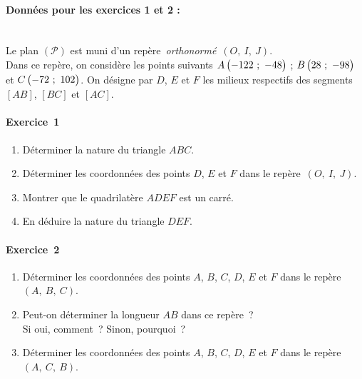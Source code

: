 \documentclass[a4paper,12pt,twocolumn,landscape]{article}
\newcommand{\rep}[3]{~$\left(#1,~#2,~#3\right)$}
\begin{document}
\vspace*{1em}

\begin{minipage}{0.45\textwidth}
\thispagestyle{firststyle}

\vspace*{1em}

\paragraph{Données pour les exercices 1 et 2 :}~\\
Le plan $\left(\mathscr{P}\right)$ est muni d'un repère~\emph{orthonormé}\rep{O}{I}{J}.\\ Dans ce repère, on considère les points suivants $A\begin{pmatrix}-122~;~-48\end{pmatrix}$ ; $B\begin{pmatrix}28~;~-98\end{pmatrix}$ et $C\begin{pmatrix}-72~;~102\end{pmatrix}$.
On désigne par $D$, $E$ et $F$ les milieux respectifs des segments $\left[AB\right]$,  $\left[BC\right]$ et $\left[AC\right]$.

\vspace*{2em}

\paragraph{Exercice~1}

\begin{enumerate}
	\item Déterminer la nature du triangle $ABC$.
	\item Déterminer les coordonnées des points $D$, $E$ et $F$ dans le repère\rep{O}{I}{J}.
	\item Montrer que le quadrilatère $ADEF$ est un carré.
	\item En déduire la nature du triangle $DEF$.
\end{enumerate}

\paragraph{Exercice~2} 

\begin{enumerate}
	\item Déterminer les coordonnées des points $A$, $B$, $C$, $D$, $E$ et $F$ dans le repère\rep{A}{B}{C}.
	\item Peut-on déterminer la longueur $AB$ dans ce repère~?\\Si oui, comment~? Sinon, pourquoi~?
	\item Déterminer les coordonnées des points $A$, $B$, $C$, $D$, $E$ et $F$ dans le repère\rep{A}{C}{B}.
\end{enumerate}


\end{minipage}
\end{document}
